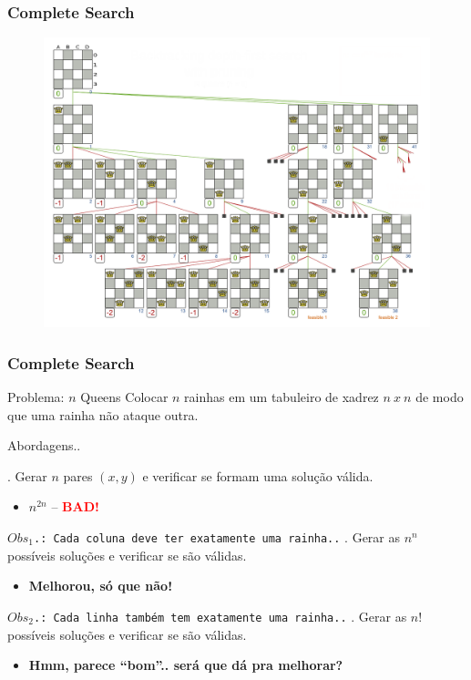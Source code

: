 \begin{frame}
\frametitle{Complete Search}
\begin{center}
\begin{figure}
\includegraphics[width=.9\textwidth]{figuras/backtrackingDepthFirstSearchNQueens.png}
\end{figure}
\end{center}
\end{frame}

\begin{frame}
\frametitle{Complete Search}
\begin{block}{Problema: $n$ Queens}
\scriptsize
Colocar $n$ rainhas em um tabuleiro de xadrez $n\ x\ n$ de modo que uma rainha não ataque outra.
\end{block}
\pause
\begin{block}{Abordagens..}
\begin{itemize}[<+->]
	. Gerar $n$ pares $(x,y)$ e verificar se formam uma solução válida.
	\begin{itemize}
		\item[] $n^{2n}$ -- \textbf{\textcolor{red}{BAD!}}
	\end{itemize}
	\bitem \texttt{$Obs_1$.: Cada coluna deve ter exatamente uma rainha..}
	. Gerar as $n^n$ possíveis soluções e verificar se são válidas.
	\begin{itemize}
		\item[] \textbf{Melhorou, só que não!}
	\end{itemize}
	\bitem \texttt{$Obs_2$.: Cada linha também tem exatamente uma rainha..}
	. Gerar as $n!$ possíveis soluções e verificar se são válidas.
	\begin{itemize}
		\item[] \textbf{Hmm, parece ``bom''.. será que dá pra melhorar?}
	\end{itemize}
\end{itemize}
\end{block}
\end{frame}

